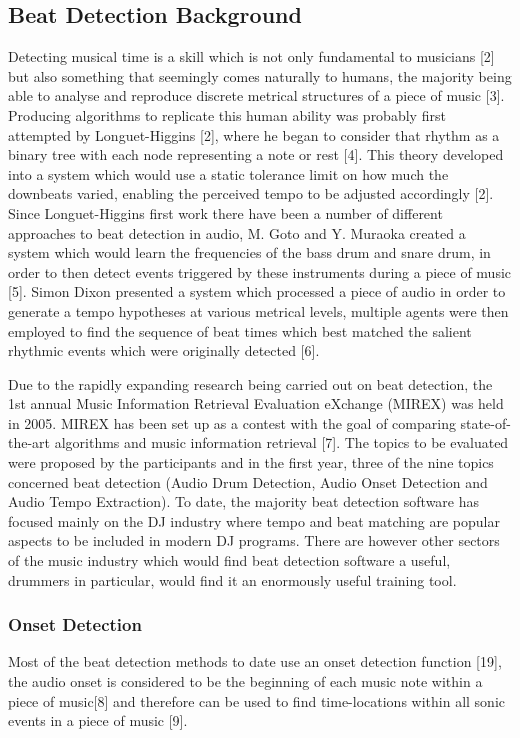 \documentclass[a4paper, 11pt]{article}
\begin{document}
\subsection{Beat Detection Background}

Detecting musical time is a skill which is not only fundamental to musicians [2] but also something that seemingly comes naturally to humans, the majority being able to analyse and reproduce discrete metrical structures of a piece of music [3]. Producing algorithms to replicate this human ability was probably first attempted by Longuet-Higgins [2], where he began to consider that rhythm as a binary tree with each node representing a note or rest [4]. This theory developed into a system which would use a static tolerance limit on how much the downbeats varied, enabling the perceived tempo to be adjusted accordingly [2]. Since Longuet-Higgins first work there have been a number of different approaches to beat detection in audio, M. Goto and Y. Muraoka created a system which would learn the frequencies of the bass drum and snare drum, in order to then detect events triggered by these instruments during a piece of music [5]. Simon Dixon presented a system which processed a piece of audio in order to generate a tempo hypotheses at various metrical levels, multiple agents were then employed to find the sequence of beat times which best matched the salient rhythmic events which were originally detected [6].

Due to the rapidly expanding research being carried out on beat detection, the 1st annual Music Information Retrieval Evaluation eXchange (MIREX) was held in 2005. MIREX has been set up as a contest with the goal of comparing state-of-the-art algorithms and music information retrieval [7]. The topics to be evaluated were proposed by the participants and in the first year, three of the nine topics concerned beat detection (Audio Drum Detection, Audio Onset Detection and Audio Tempo Extraction). To date, the majority beat detection software has focused mainly on the DJ industry where tempo and beat matching are popular aspects to be included in modern DJ programs. There are however other sectors of the music industry which would find beat detection software a useful, drummers in particular, would find it an enormously useful training tool.

\subsubsection{Onset Detection}
Most of the beat detection methods to date use an onset detection function [19], the audio onset is considered to be the beginning of each music note within a piece of music[8] and therefore can be used to find time-locations within all sonic events in a piece of music [9]. 
\end{document}
